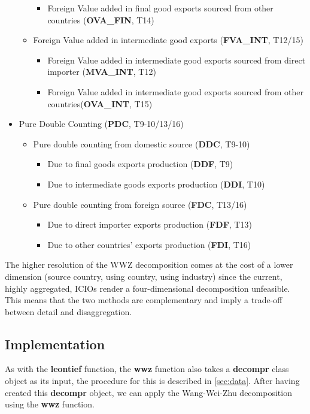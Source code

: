\documentclass[a4paper]{article}\usepackage[]{graphicx}\usepackage[]{color}
\begin{document}
\begin{itemize}
\begin{itemize}
\begin{itemize}
\item Foreign Value added in final good exports sourced from other countries (\textbf{OVA\_FIN}, T14)
\end{itemize}
\item Foreign Value added in intermediate good exports (\textbf{FVA\_INT}, T12/15)
\begin{itemize}
\item Foreign Value added in intermediate good exports sourced from direct importer (\textbf{MVA\_INT}, T12)
\item Foreign Value added in intermediate good exports sourced from other countries(\textbf{OVA\_INT}, T15)
\end{itemize}
\end{itemize}
\item Pure Double Counting (\textbf{PDC}, T9-10/13/16)
\begin{itemize}
\item Pure double counting from domestic source (\textbf{DDC}, T9-10)
\begin{itemize}
\item Due to final goods exports production (\textbf{DDF}, T9)
\item Due to intermediate goods exports production (\textbf{DDI}, T10)
\end{itemize}
\item Pure double counting from foreign source (\textbf{FDC}, T13/16)
\begin{itemize}
\item Due to direct importer exports production (\textbf{FDF}, T13)
\item Due to other countries' exports production (\textbf{FDI}, T16)
\end{itemize}
\end{itemize}
\end{itemize}
The higher resolution of the WWZ decomposition comes at the cost of a lower dimension (source country, using country, using industry) since the current, highly aggregated, ICIOs render a four-dimensional decomposition unfeasible. This means that the two methods are complementary and imply a trade-off between detail and disaggregation.

\subsection{Implementation}
As with the \textbf{leontief} function, the \textbf{wwz} function also takes a \textbf{decompr} class object as its input, the procedure for this is described in \cref{sec:data}.
After having created this \textbf{decompr} object, we can apply the Wang-Wei-Zhu decomposition using the \textbf{wwz} function.
\end{document}
